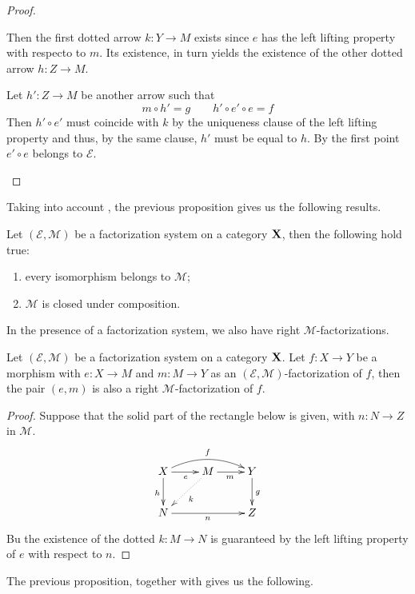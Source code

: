 \documentclass[a4paper,UKenglish,cleveref,pdftex,thm-restate,numberwithinsect]{lipics-v2021}
\def\X{\textbf {\textup{X}}}
\begin{document}
\begin{proof}
\begin{enumerate}
		Then the first dotted arrow $k\colon Y\to M$ exists since $e$ has the left lifting property with respecto to $m$. Its existence, in turn yields the existence of the other dotted arrow $h\colon Z\to M$. 
		
		Let $h'\colon Z\to M$ be another arrow such that 
		\[m\circ h'=g \qquad h'\circ e'\circ e=f\]
		Then $h'\circ e'$ must coincide with $k$ by the uniqueness clause of the left lifting property and thus, by the same clause, $h'$ must be equal to $h$. By the first point $e'\circ e$ belongs to $\mathcal{E}$. \qedhere 
	\end{enumerate}
\end{proof}

Taking into account , the previous proposition gives us the following results.

\begin{corollary}\label{cor:m}Let $(\mathcal{E}, \mathcal{M})$ be a factorization system on a category $\X$, then the following hold true:
	\begin{enumerate}
		\item every isomorphism belongs to $\mathcal{M}$;
		\item $\mathcal{M}$ is closed under composition.
	\end{enumerate}
\end{corollary}

In the presence of a factorization system, we also have right $\mathcal{M}$-factorizations.

\begin{proposition}\label{prop:rfact}
	Let $(\mathcal{E}, \mathcal{M})$ be a factorization system on a category $\X$. Let $f\colon X\to Y$ be a morphism with $e\colon X\to M$ and $m\colon M\to Y$ as an $(\mathcal{E}, \mathcal{M})$-factorization of $f$, then the pair $(e, m)$ is also a right $\mathcal{M}$-factorization of $f$.
\end{proposition}
\begin{proof}
	Suppose that the solid part of the rectangle below is given, with $n\colon N\to Z$ in $\mathcal{M}$. 
	\[\xymatrix{X \ar[d]_{h} \ar@/^.4cm/[rr]^{f} \ar[r]_{e}& M \ar@{.>}[dl]^{k} \ar[r]_{m} & Y \ar[d]^{g}\\N \ar[rr]_{n}&& Z}\]
	Bu the existence of the dotted $k\colon M\to N$ is guaranteed by the left lifting property of $e$ with respect to $n$.
\end{proof}

The previous proposition, together with  gives us the following.
\end{document}
